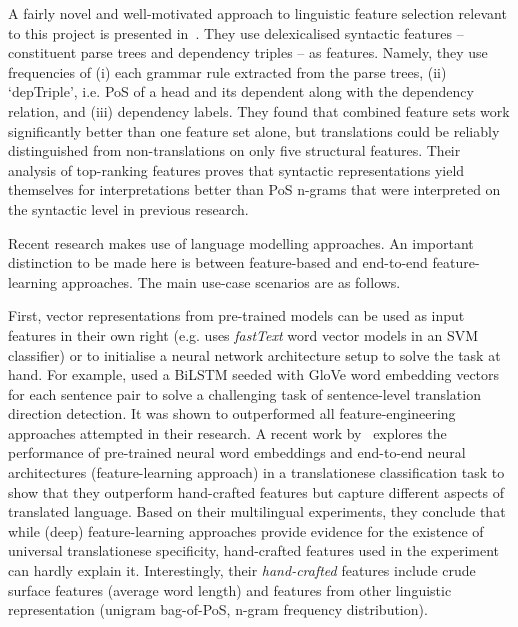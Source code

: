 A fairly novel and well-motivated approach to linguistic feature selection relevant to this project is presented in~\citet{Hu2018}. They use delexicalised syntactic features -- constituent parse trees and dependency triples -- as features. Namely, they use frequencies of (i) each grammar rule extracted from the parse trees, (ii) `depTriple', i.e. PoS of a head and its dependent along with the dependency relation, and (iii) dependency labels. They found that combined feature sets work significantly better than one feature set alone, but translations could be reliably distinguished from non-translations on only five structural features. Their analysis of top-ranking features proves that syntactic representations yield themselves for interpretations better than PoS n-grams that were interpreted on the syntactic level in previous research.  

Recent research makes use of language modelling approaches. An important distinction to be made here is between feature-based and end-to-end feature-learning approaches. The main use-case scenarios are as follows. 

First, vector representations from pre-trained models can be used as input features in their own right (e.g. \citet{Pylypenko2021} uses \textit{fastText} word vector models in an SVM classifier) or to initialise a neural network architecture setup to solve the task at hand. For example, \citet{Sominsky2019} used a \gls{BiLSTM} seeded with GloVe word embedding vectors~ for each sentence pair to solve a challenging task of sentence-level translation direction detection. It was shown to outperformed all feature-engineering approaches attempted in their research. 
A recent work by~\citet{Pylypenko2021} explores the performance of pre-trained neural word embeddings and end-to-end neural architectures (feature-learning approach) in a translationese classification task to show that they outperform hand-crafted features but capture different aspects of translated language. Based on their multilingual experiments, they conclude that while (deep) feature-learning approaches provide evidence for the existence of universal translationese specificity, hand-crafted features used in the experiment can hardly explain it. Interestingly, their \textit{hand-crafted} features include crude surface features (average word length) and features from other linguistic representation (unigram bag-of-PoS, n-gram frequency distribution). %

